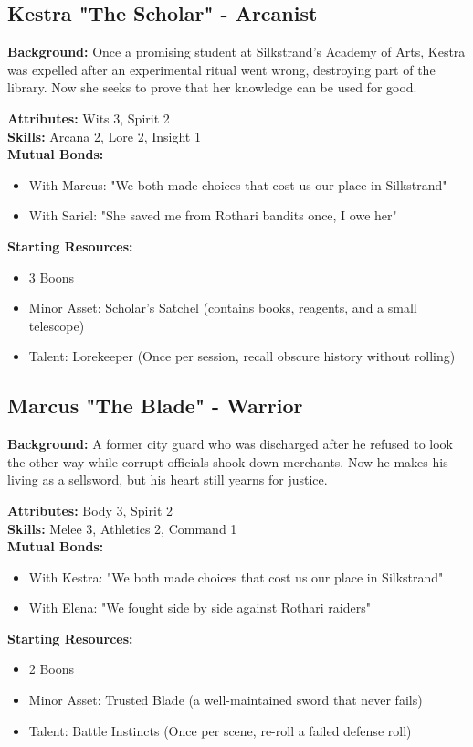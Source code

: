 \documentclass[11pt]{article}
\newenvironment{characterbox}[1]{%
  \begin{mdframed}[backgroundcolor=shadecolor, linewidth=1pt, linecolor=headercolor]%
  \subsection*{#1}%
}{%
  \end{mdframed}%
}
\begin{document}
\begin{characterbox}{Kestra "The Scholar" - Arcanist}
\textbf{Background:} Once a promising student at Silkstrand's Academy of Arts, Kestra was expelled after an experimental ritual went wrong, destroying part of the library. Now she seeks to prove that her knowledge can be used for good.

\textbf{Attributes:} Wits 3, Spirit 2 \\
\textbf{Skills:} Arcana 2, Lore 2, Insight 1 \\
\textbf{Mutual Bonds:} 
\begin{itemize}
\item With Marcus: "We both made choices that cost us our place in Silkstrand"
\item With Sariel: "She saved me from Rothari bandits once, I owe her"
\end{itemize}

\textbf{Starting Resources:}
\begin{itemize}
\item 3 Boons
\item Minor Asset: Scholar's Satchel (contains books, reagents, and a small telescope)
\item Talent: Lorekeeper (Once per session, recall obscure history without rolling)
\end{itemize}
\end{characterbox}

\begin{characterbox}{Marcus "The Blade" - Warrior}
\textbf{Background:} A former city guard who was discharged after he refused to look the other way while corrupt officials shook down merchants. Now he makes his living as a sellsword, but his heart still yearns for justice.

\textbf{Attributes:} Body 3, Spirit 2 \\
\textbf{Skills:} Melee 3, Athletics 2, Command 1 \\
\textbf{Mutual Bonds:} 
\begin{itemize}
\item With Kestra: "We both made choices that cost us our place in Silkstrand"
\item With Elena: "We fought side by side against Rothari raiders"
\end{itemize}

\textbf{Starting Resources:}
\begin{itemize}
\item 2 Boons
\item Minor Asset: Trusted Blade (a well-maintained sword that never fails)
\item Talent: Battle Instincts (Once per scene, re-roll a failed defense roll)
\end{itemize}
\end{characterbox}
\end{document}
